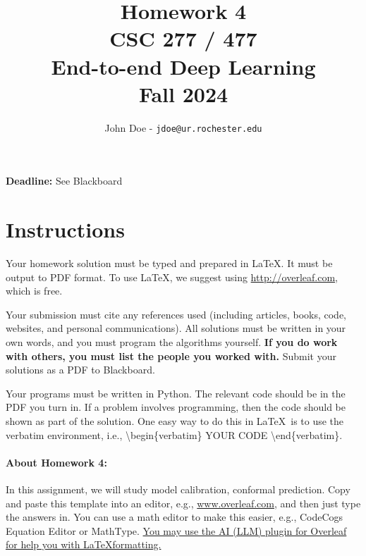 \documentclass[11pt, oneside]{article}   	%
\title{Homework 4 \\ CSC 277 / 477 \\ End-to-end Deep Learning \\ Fall 2024}
\author{John Doe - \texttt{jdoe@ur.rochester.edu}}
\date{}
\begin{document}
\maketitle

\begin{center}
    \textbf{Deadline:} See Blackboard    
\end{center}


\section*{Instructions}

Your homework solution must be typed and prepared in \LaTeX. It must be output to PDF format. To use \LaTeX, we suggest using \url{http://overleaf.com}, which is free.

Your submission must cite any references used (including articles, books, code, websites, and personal communications).  All solutions must be written in your own words, and you must program the algorithms yourself. \textbf{If you do work with others, you must list the people you worked with.} Submit your solutions as a PDF to Blackboard. 


Your programs must be written in Python. The relevant code should be in the PDF you turn in. If a problem involves programming, then the code should be shown as part of the solution. One easy way to do this in \LaTeX \, is to use the verbatim environment, i.e., \textbackslash begin\{verbatim\} YOUR CODE \textbackslash end\{verbatim\}.




\paragraph{About Homework 4:} In this assignment, we will study model calibration, conformal prediction. Copy and paste this template into an editor, e.g., \url{www.overleaf.com}, and then just type the answers in. You can use a math editor to make this easier, e.g., CodeCogs Equation Editor or MathType. \hyperlink{https://blog.writefull.com/texgpt-harness-the-power-of-chatgpt-in-overleaf/}{You may use the AI (LLM) plugin for Overleaf for help you with \LaTeX formatting.}



\end{document}
